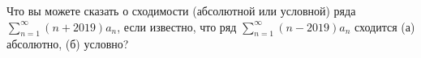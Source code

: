 \documentclass{article}
\begin{document}
Что вы можете сказать о сходимости (абсолютной или условной) ряда $\sum_{n=1}^{\infty} (n+2019)a_n$, если известно, 
что ряд $\sum_{n=1}^{\infty} (n-2019)a_n$ сходится (а) абсолютно, (б) условно?
\end{document}
